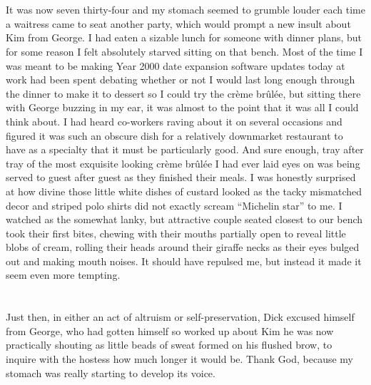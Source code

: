 \documentclass[]{book}
\begin{document}
\chapter{}\label{section-2}

It was now seven thirty-four and my stomach seemed to grumble louder
each time a waitress came to seat another party, which would prompt a
new insult about Kim from George. I had eaten a sizable lunch for
someone with dinner plans, but for some reason I felt absolutely starved
sitting on that bench. Most of the time I was meant to be making Year
2000 date expansion software updates today at work had been spent
debating whether or not I would last long enough through the dinner to
make it to dessert so I could try the crème brûlée, but sitting there
with George buzzing in my ear, it was almost to the point that it was
all I could think about. I had heard co-workers raving about it on
several occasions and figured it was such an obscure dish for a
relatively downmarket restaurant to have as a specialty that it must be
particularly good. And sure enough, tray after tray of the most
exquisite looking crème brûlée I had ever laid eyes on was being served
to guest after guest as they finished their meals. I was honestly
surprised at how divine those little white dishes of custard looked as
the tacky mismatched decor and striped polo shirts did not exactly
scream ``Michelin star'' to me. I watched as the somewhat lanky, but
attractive couple seated closest to our bench took their first bites,
chewing with their mouths partially open to reveal little blobs of
cream, rolling their heads around their giraffe necks as their eyes
bulged out and making mouth noises. It should have repulsed me, but
instead it made it seem even more tempting.

\chapter{}\label{section-3}

Just then, in either an act of altruism or self-preservation, Dick
excused himself from George, who had gotten himself so worked up about
Kim he was now practically shouting as little beads of sweat formed on
his flushed brow, to inquire with the hostess how much longer it would
be. Thank God, because my stomach was really starting to develop its
voice.

\chapter{}\label{section-4}
\end{document}
